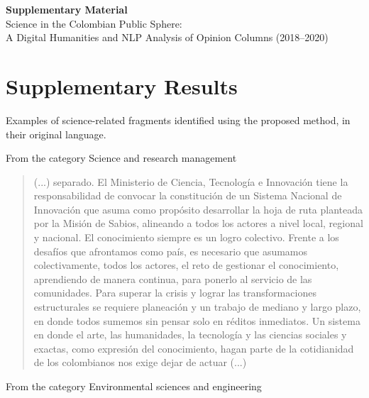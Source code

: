 \documentclass[12pt]{article}
\begin{document}
	
	\begin{center}
		{\LARGE \textbf{Supplementary Material}}\\[0.5em]
		{\large Science in the Colombian Public Sphere:  \\
			A Digital Humanities and NLP Analysis of Opinion Columns (2018–2020)}
	\end{center}
	

	\section{Supplementary Results}
	Examples of science-related fragments identified using the proposed method, in their original language.
	
	From the category Science and research management
	
	\begin{quote}
		(...) separado. El Ministerio de Ciencia, Tecnología e Innovación tiene la responsabilidad de convocar la constitución de un Sistema Nacional de Innovación que asuma como propósito desarrollar la hoja de ruta planteada por la Misión de Sabios, alineando a todos los actores a nivel local, regional y nacional. El conocimiento siempre es un logro colectivo. Frente a los desafíos que afrontamos como país, es necesario que asumamos colectivamente, todos los actores, el reto de gestionar el conocimiento, aprendiendo de manera continua, para ponerlo al servicio de las comunidades. Para superar la crisis y lograr las transformaciones estructurales se requiere planeación y un trabajo de mediano y largo plazo, en donde todos sumemos sin pensar solo en réditos inmediatos. Un sistema en donde el arte, las humanidades, la tecnología y las ciencias sociales y exactas, como expresión del conocimiento, hagan parte de la cotidianidad de los colombianos nos exige dejar de actuar (...)
		
	\end{quote}
	
	From the category Environmental sciences and engineering
	
\end{document}
